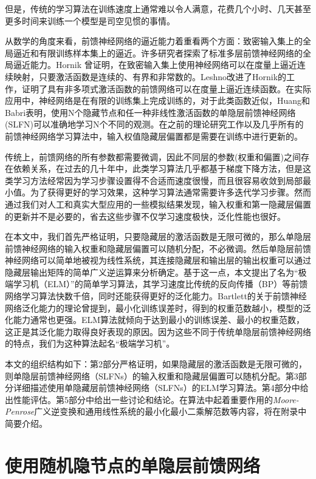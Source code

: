 \documentclass[conference]{IEEEtran}
\begin{document}
但是，传统的学习算法在训练速度上通常难以令人满意，花费几个小时、几天甚至更多时间来训练一个模型是司空见惯的事情。

从数学的角度来看，前馈神经网络的逼近能力着重看两个方面：致密输入集上的全局逼近和有限训练样本集上的逼近。许多研究者探索了标准多层前馈神经网络的全局逼近能力。Hornik 曾证明，在致密输入集上使用神经网络可以在度量上逼近连续映射，只要激活函数是连续的、有界和非常数的。Leshno改进了Hornik的工作，证明了具有非多项式激活函数的前馈网络可以在度量上逼近连续函数。在实际应用中，神经网络是在有限的训练集上完成训练的，对于此类函数近似，Huang和Babri表明，使用N个隐藏节点和任一种非线性激活函数的单隐层前馈神经网络(SLFN)可以准确地学习N个不同的观测。在之前的理论研究工作以及几乎所有的前馈神经网络学习算法中，输入权值隐藏层偏置都是需要在训练中进行更新的。

传统上，前馈网络的所有参数都需要微调，因此不同层的参数(权重和偏置)之间存在依赖关系，在过去的几十年中，此类学习算法几乎都基于梯度下降方法，但是这类学习方法经常因为学习步骤设置得不合适而速度很慢，而且很容易收敛到局部最小值。为了获得更好的学习效果，这种学习算法通常需要许多迭代学习步骤。然而通过我们对人工和真实大型应用的一些模拟结果发现，输入权重和第一隐藏层偏置的更新并不是必要的，省去这些步骤不仅学习速度极快，泛化性能也很好。

在本文中，我们首先严格证明，只要隐藏层的激活函数是无限可微的，那么单隐层前馈神经网络的输入权重和隐藏层偏置可以随机分配，不必微调。然后单隐层前馈神经网络可以简单地被视为线性系统，其连接隐藏层和输出层的输出权重可以通过隐藏层输出矩阵的简单广义逆运算来分析确定。基于这一点，本文提出了名为“极端学习机（ELM）”的简单学习算法，其学习速度比传统的反向传播（BP）等前馈网络学习算法快数千倍，同时还能获得更好的泛化能力。Bartlett的关于前馈神经网络泛化能力的理论曾提到，最小化训练误差时，得到的权重范数越小，模型的泛化能力通常也更强。ELM算法就倾向于达到最小的训练误差、最小的权重范数，这正是其泛化能力取得良好表现的原因。因为这些不同于传统单隐层前馈神经网络的特点，我们为这种算法起名“极端学习机”。

本文的组织结构如下：第2部分严格证明，如果隐藏层的激活函数是无限可微的，则单隐层前馈神经网络（SLFNs）的输入权重和隐藏层偏置可以随机分配。第3部分详细描述使用单隐藏层前馈神经网络（SLFNs）的ELM学习算法。第4部分中给出性能评估。第5部分中给出一些讨论和结论。在算法中起着重要作用的\textit{Moore-Penrose}广义逆变换和通用线性系统的最小化最小二乘解范数等内容，将在附录中简要介绍。


\section{使用随机隐节点的单隐层前馈网络}
\end{document}
